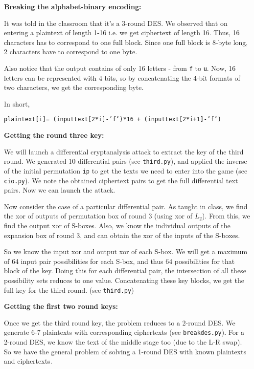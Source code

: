 \documentclass[11pt]{article}
\begin{document}
\bigskip
\bigskip

\textbf{Breaking the alphabet-binary encoding: }
\medskip

It was told in the classroom that it's a 3-round DES. We observed that on entering a plaintext of length 1-16 i.e. we get ciphertext of length 16. Thus, 16 characters has to correspond to one full block. Since one full block is 8-byte long, 2 characters have to correspond to one byte. 

Also notice that the output contains of only 16 letters - from \texttt{f} to \texttt{u}. Now, 16 letters can be represented with 4 bits, so by concatenating the 4-bit formats of two characters, we get the corresponding byte.

In short, 

\begin{center}
  \texttt{plaintext[i]= (inputtext[2*i]-'f')*16 + (inputtext[2*i+1]-'f')}
\end{center}
\medskip
\pagebreak

\textbf{Getting the round three key: }
\medskip

We will launch a differential cryptanalysis attack to extract the key of the third round. We generated 10 differential pairs (see \texttt{third.py}), and applied the inverse of the initial permutation \texttt{ip} to get the texts we need to enter into the game (see \texttt{cio.py}). We note the obtained ciphertext pairs to get the full differential text pairs. Now we can launch the attack.
\medskip

Now consider the case of a particular differential pair. As taught in class, we find the xor of outputs of permutation box of round 3 (using xor of $L_2$). From this, we find the output xor of S-boxes. Also, we know the individual outputs of the expansion box of round 3, and can obtain the xor of the inputs of the S-boxes.
\medskip

So we know the input xor and output xor of each S-box. We will get a maximum of 64 input pair possibilities for each S-box, and thus 64 possibilities for that block of the key. Doing this for each differential pair, the intersection of all these possibility sets reduces to one value. Concatenating these key blocks, we get the full key for the third round. (see \texttt{third.py})
\medskip
\bigskip

\textbf{Getting the first two round keys: }
\medskip

Once we get the third round key, the problem reduces to a 2-round DES. We generate 6-7 plaintexts with corresponding ciphertexts (see \texttt{breakdes.py}). For a 2-round DES, we know the text of the middle stage too (due to the L-R swap). So we have the general problem of solving a 1-round DES with known plaintexts and ciphertexts.
\medskip
\end{document}
